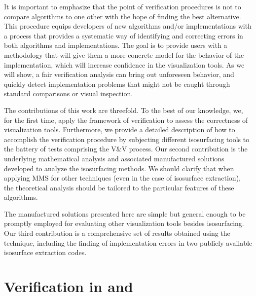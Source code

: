 It is important to emphasize that the point of verification procedures
is not to compare algorithms to one other with
the hope of finding the best alternative.
This procedure equips developers of new algorithms and/or 
implementations with a process that provides a systematic way 
of identifying and correcting errors in both algorithms and implementations.
The goal is to provide users with a methodology that will give them a
more concrete model for the behavior of the implementation, which will
increase confidence in the visualization tools. 
As we will show, a fair verification analysis can 
bring out unforeseen behavior, and quickly detect implementation problems that
might not be caught through standard comparisons or visual inspection.

The contributions of this work are threefold. To the best of our
knowledge, we, for the first time, apply the framework of 
verification to assess the correctness of visualization tools.
Furthermore, we provide a detailed description of how to accomplish the 
verification procedure by subjecting different isosurfacing tools 
to the battery of tests comprising the V\&V process. 
Our second contribution is the underlying mathematical analysis and associated 
manufactured solutions developed to analyze the isosurfacing methods.
We should clarify that when applying MMS for other techniques (even in
the case of isosurface extraction), the theoretical analysis should be
tailored to the particular features of these algorithms.

The manufactured solutions presented here are simple but
general enough to be promptly employed for evaluating other 
visualization tools besides isosurfacing.
Our third contribution is a comprehensive set of results obtained
using the technique, including the finding of implementation errors in
two publicly available isosurface extraction codes.

\section{Verification in \cs{} and \cse{}}

